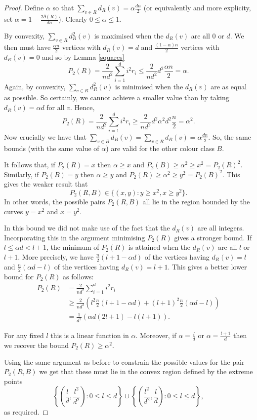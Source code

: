 \documentclass[12pt,a4paper]{article}
\begin{document}
\begin{proof}
Define $\alpha$ so that $\sum_{v\in R} d_R(v)=\alpha\frac{dn}{2}$ (or equivalently and more explicity, set $\alpha=1-\frac{2\partial(R)}{dn}$). Clearly $0\leq\alpha\leq 1$.

By convexity, $\sum_{v\in R} d^2_R(v)$ is maximised when the $d_R(v)$ are all $0$ or $d$. We then must have $\frac{\alpha n}{2}$ vertices with $d_R(v)=d$ and $\frac{\left(1-\alpha\right)n}{2}$ vertices with $d_R(v)=0$ and so by Lemma \ref{squares}
\[
P_2(R)=\frac{2}{nd^2}\sum_{i=1}^d i^2r_i\leq\frac{2}{nd^2}d^2\frac{\alpha n}{2}=\alpha.
\]
Again, by convexity, $\sum_{v\in R} d^2_R(v)$ is minimised when the $d_R(v)$ are as equal as possible. So certainly, we cannot achieve a smaller value than by taking $d_R(v)=\alpha d$ for all $v$. Hence,
\[
P_2(R)=\frac{2}{nd^2}\sum_{i=1}^d i^2r_i\geq\frac{2}{nd^2}d^2\alpha^2 d^2 \frac{n}{2}=\alpha^2.
\]
Now crucially we have that $\sum_{v\in B} d_B(v)=\sum_{v\in R} d_R(v)=\alpha\frac{dn}{2}$. So, the same bounds (with the same value of $\alpha$) are valid for the other colour class $B$. 

It follows that, if $P_2(R)=x$ then $\alpha\geq x$ and $P_2(B)\geq\alpha^2\geq x^2=P_2(R)^2$. Similarly, if $P_2(B)=y$ then $\alpha\geq y$ and $P_2(R)\geq\alpha^2\geq y^2=P_2(B)^2$. This gives the weaker result that
\[
P_2(R,B)\in\{(x,y) : y\geq x^2, x\geq y^2\}.
\]
In other words, the possible pairs $P_2(R,B)$ all lie in the region bounded by the curves $y=x^2$ and $x=y^2$.

In this bound we did not make use of the fact that the $d_R(v)$ are all integers. Incorporating this in the argument minimising $P_2(R)$ gives a stronger bound. If $l\leq\alpha d<l+1$, the minimum of $P_2(R)$ is attained when the $d_R(v)$ are all $l$ or $l+1$. More precisely, we have $\frac{n}{2}\left(l+1-\alpha d\right)$ of the vertices having $d_R(v)=l$ and $\frac{n}{2}\left(\alpha d-l\right)$ of the vertices having $d_R(v)=l+1$. This gives a better lower bound for $P_2(R)$ as follows:
\begin{align*}
P_2(R)&=\frac{2}{nd^2}\sum_{i=1}^d i^2r_i\\
&\geq\frac{2}{nd^2}\left(l^2\frac{n}{2}\left(l+1-\alpha d\right)+(l+1)^2\frac{n}{2}\left(\alpha d-l\right)\right)\\
&=\frac{1}{d^2}\left(\alpha d(2l+1)-l(l+1)\right).
\end{align*}

For any fixed $l$ this is a linear function in $\alpha$. Moreover, if $\alpha=\frac{l}{d}$ or $\alpha=\frac{l+1}{d}$ then we recover the bound $P_2(R)\geq\alpha^2$. 

Using the same argument as before to constrain the possible values for the pair $P_2(R,B)$ we get that these must lie in the convex region defined by the extreme points 
\[
\left\{\left(\frac{l}{d},\frac{l^2}{d^2}\right):0 \leq l \leq d\right\} \cup \left\{\left(\frac{l^2}{d^2},\frac{l}{d}\right):0 \leq l \leq d\right\},
\]
as required.
\end{proof}
\end{document}
